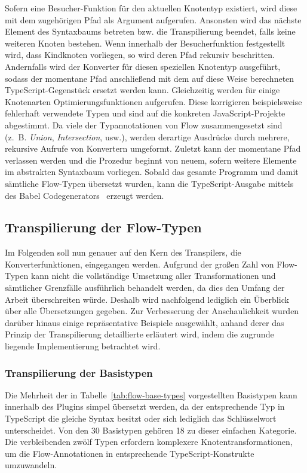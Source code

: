 Sofern eine Besucher-Funktion für den aktuellen Knotentyp existiert, wird diese mit dem zugehörigen Pfad als Argument aufgerufen. Ansonsten wird das nächste Element des Syntaxbaums betreten bzw. die Transpilierung beendet, falls keine weiteren Knoten bestehen. Wenn innerhalb der Besucherfunktion festgestellt wird, dass Kindknoten vorliegen, so wird deren Pfad rekursiv beschritten. Andernfalls wird der Konverter für diesen speziellen Knotentyp ausgeführt, sodass der momentane Pfad anschließend mit dem auf diese Weise berechneten TypeScript-Gegenstück ersetzt werden kann. Gleichzeitig werden für einige Knotenarten Optimierungsfunktionen aufgerufen. Diese korrigieren beispielsweise fehlerhaft verwendete Typen und sind auf die konkreten JavaScript-Projekte abgestimmt. Da viele der Typannotationen von Flow zusammengesetzt sind (z.~B. \textit{Union}, \textit{Intersection}, usw.), werden derartige Ausdrücke durch mehrere, rekursive Aufrufe von Konvertern umgeformt. Zuletzt kann der momentane Pfad verlassen werden und die Prozedur beginnt von neuem, sofern weitere Elemente im abstrakten Syntaxbaum vorliegen. Sobald das gesamte Programm und damit sämtliche Flow-Typen übersetzt wurden, kann die TypeScript-Ausgabe mittels des Babel Codegenerators~\autocite{BABEL:GENERATOR} erzeugt werden.

\subsection{Transpilierung der Flow-Typen}

Im Folgenden soll nun genauer auf den Kern des Transpilers, die Konverterfunktionen, eingegangen werden. Aufgrund der großen Zahl von Flow-Typen kann nicht die vollständige Umsetzung aller Transformationen und sämtlicher Grenzfälle ausführlich behandelt werden, da dies den Umfang der Arbeit überschreiten würde. Deshalb wird nachfolgend lediglich ein Überblick über alle Übersetzungen gegeben. Zur Verbesserung der Anschaulichkeit wurden darüber hinaus einige repräsentative Beispiele ausgewählt, anhand derer das Prinzip der Transpilierung detaillierte erläutert wird, indem die zugrunde liegende Implementierung betrachtet wird.

\subsubsection{Transpilierung der Basistypen}

Die Mehrheit der in Tabelle~\ref{tab:flow-base-types} vorgestellten Basistypen kann innerhalb des Plugins simpel übersetzt werden, da der entsprechende Typ in TypeScript die gleiche Syntax besitzt oder sich lediglich das Schlüsselwort unterscheidet. Von den 30 Basistypen gehören 18 zu dieser einfachen Kategorie. Die verbleibenden zwölf Typen erfordern komplexere Knotentransformationen, um die Flow-Annotationen in entsprechende TypeScript-Konstrukte umzuwandeln.

